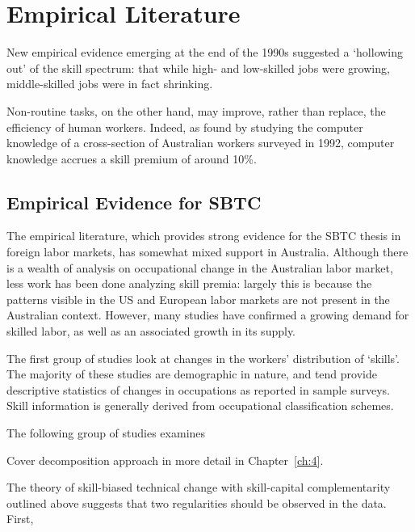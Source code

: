 \chapter{Empirical Literature}\label{ch:3}


New empirical evidence emerging at the end of the 1990s suggested a `hollowing out' of the skill spectrum: that while high- and low-skilled jobs were growing, middle-skilled jobs were in fact shrinking.

Non-routine tasks, on the other hand, may improve, rather than replace, the efficiency of human workers. Indeed, as \citet{Borland2004} found by studying the computer knowledge of a cross-section of Australian workers surveyed in 1992, computer knowledge accrues a skill premium of around 10\%.


\section{Empirical Evidence for SBTC}

The empirical literature, which provides strong evidence for the SBTC thesis in foreign labor markets, has somewhat mixed support in Australia. Although there is a wealth of analysis on occupational change in the Australian labor market, less work has been done analyzing skill premia: largely this is because the patterns visible in the US and European labor markets are not present in the Australian context. However, many studies have confirmed a growing demand for skilled labor, as well as an associated growth in its supply.

The first group of studies look at changes in the workers' distribution of `skills'. The majority of these studies are demographic in nature, and tend provide descriptive statistics of changes in occupations as reported in sample surveys. Skill information is generally derived from occupational classification schemes.

The following group of studies examines 

Cover decomposition approach in more detail in Chapter~\ref{ch:4}.

The theory of skill-biased technical change with skill-capital complementarity outlined above suggests that two regularities should be observed in the data. First, 





